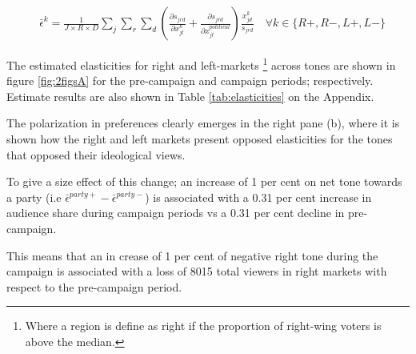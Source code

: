 \documentclass[12pt]{article}
\begin{document}
	\begin{equation}\label{eq:elasticities}
		\begin{aligned}
			& \bar{\epsilon}^k= \frac{1}{J\times R \times D}\sum_{j}\sum_{r} \sum_{d} \left(\frac{\partial s_{jrd}}{\partial x_{jt}^k} +  \frac{\partial s_{jrd}}{\partial x_{jt}^{political}} \right) \frac{x_{jd}^k}{s_{jrd}}    \quad \forall k \in \{R+,R-,L+,L-\}
		\end{aligned}
	\end{equation}             
	
	
The estimated elasticities for right and left-markets \footnote{Where a region is define as right if the proportion of right-wing voters is above the median. } across tones are shown in figure \ref{fig:2figsA} for the pre-campaign and campaign periods; respectively. Estimate results are also shown in Table \ref{tab:elasticities} on the Appendix. 

The polarization in preferences clearly emerges in the right pane (b), where it is shown how the right and left markets present opposed elasticities for the tones that opposed their ideological views. 

To give a size effect of this change; an increase of 1 per cent on net tone towards a party (i.e $ \bar{\epsilon}^{party+}- \bar{\epsilon}^{party-}$) is associated with a 0.31 per cent increase in audience share during campaign periods vs a 0.31 per cent decline in pre-campaign.

This means that an in crease of 1 per cent of negative right tone during the campaign is associated with a loss of 8015 total viewers in right markets with respect to the pre-campaign period. 
\end{document}
